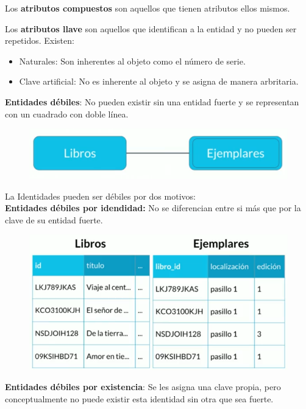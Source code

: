 \documentclass{article}
\begin{document}
Los \textbf{atributos compuestos} son aquellos que tienen atributos ellos
mismos.

Los \textbf{atributos llave} son aquellos que identifican a la entidad y no
pueden ser repetidos. Existen:

\begin{itemize}
  \item Naturales: Son inherentes al objeto como el número de serie.
  \item Clave artificial: No es inherente al objeto y se asigna de manera arbritaria.
\end{itemize}

\textbf{Entidades débiles}: No pueden existir sin una entidad fuerte y se representan
con un cuadrado con doble línea.

\begin{figure}[h!]
    \centering
      \includegraphics[scale=0.5]{./Pictures/005_entidades_debiles.png}
\end{figure}

La Identidades pueden ser débiles por dos motivos:\\

\textbf{Entidades débiles por idendidad:} No se diferencian entre si más que
por la clave de su entidad fuerte.

\begin{figure}[h!]
    \centering
      \includegraphics[scale=0.5]{./Pictures/006_entidades_debiles_dependientes.png}
\end{figure}

\newpage
\textbf{Entidades débiles por existencia}: Se les asigna una clave propia,
pero conceptualmente no puede existir esta identidad sin otra que sea fuerte.
\end{document}
